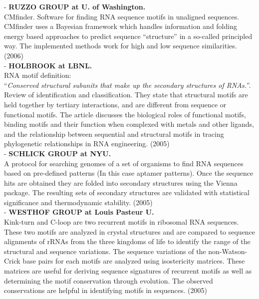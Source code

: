 - \textbf{RUZZO GROUP at U. of Washington.}\\
CMfinder.  Software for finding RNA sequence motifs in unaligned  sequences.
CMfinder uses a Bayesian  framework which handles information and  folding
energy based approaches  to predict sequence ``structure'' in a so-called
principled way. The implemented methods work for high
and low sequence similarities. (2006)
\cite{yao2006}\\

- \textbf{HOLBROOK at LBNL.}\\
RNA motif definition:\\
``\textit{Conserved  structural subunits that  make up the  secondary
structures of RNAs.}''.\\
Review of identification and
classification. They state that structural
motifs are held together  by tertiary interactions,  and   are
different  from sequence or functional motifs.  The  article discusses
the  biological  roles of  functional motifs, binding motifs and their
function when complexed with metals and other ligands, and the
relationship between sequential and structural motifs in tracing
phylogenetic relationships in RNA engineering. (2005)
\cite{hendrix2005} \cite{holbrook2005}\\

- \textbf{SCHLICK GROUP at NYU.}\\
A protocol for searching genomes of a set of organisms to find RNA
sequences based on pre-defined patterns (In this case aptamer
patterns). Once the sequence hits are
obtained they are folded into secondary structures using the Vienna
package. The resulting sets of secondary structures are validated with
statistical significance and thermodynamic stability. (2005)
\cite{laserson2005}\\

- \textbf{WESTHOF GROUP at Louis Pasteur U.}\\
Kink-turn  and  C-loop are  two  recurrent  motifs  in ribosomal  RNA
sequences. These two motifs are analyzed in crystal structures and are
compared to  sequence alignments of  rRNAs from the three  kingdoms of
life   to  identify  the   range  of   the  structural   and  sequence
variations. The sequence variations of the non-Watson-Crick base pairs
for  each  motifs  are  analyzed using  isostericity  matrices.  These
matrices  are useful  for  deriving sequence  signatures of  recurrent
motifs  as   well  as  determining  the   motif  conservation  through
evolution.  The  observed  conservations  are helpful  in  identifying
motifs in sequences. (2005)
\cite{lescoute2005}\\

